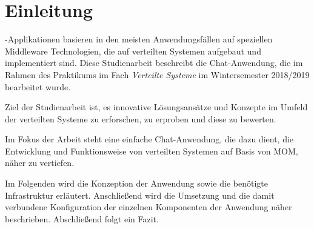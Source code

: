 \documentclass[10pt,journal,compsoc]{IEEEtran}
\begin{document}
\section{Einleitung}
\label{sec:Einleitung}
\fi




%
%
%
%
-Applikationen basieren in den meisten Anwendungsfällen auf speziellen Middleware Technologien, die auf verteilten Systemen aufgebaut und implementiert sind. Diese Studienarbeit beschreibt die Chat-Anwendung, die im Rahmen des Praktikums im Fach \textit{Verteilte Systeme} im Wintersemester 2018/2019 bearbeitet wurde. 

Ziel der Studienarbeit ist, es innovative Lösungsansätze und Konzepte im Umfeld der verteilten Systeme zu erforschen, zu erproben und diese zu bewerten. 

Im Fokus der Arbeit steht eine einfache Chat-Anwendung, die dazu dient, die Entwicklung und Funktionsweise von verteilten Systemen auf Basis von \ac{MOM}, näher zu vertiefen.

Im Folgenden wird die Konzeption der Anwendung sowie die benötigte Infrastruktur erläutert. Anschließend wird die Umsetzung und die damit verbundene Konfiguration der einzelnen Komponenten der Anwendung näher beschrieben. Abschließend folgt ein Fazit. 
\end{document}
